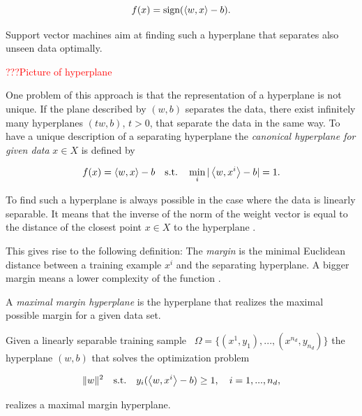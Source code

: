 \[ f(x) = \text{sign}(\left\langle w,x\right\rangle-b). \]

Support vector machines aim at finding such a hyperplane that separates also unseen data optimally.

\textcolor{red}{???Picture of hyperplane}

One problem of this approach is that the representation of a hyperplane is not unique. If the plane described by \((w,b)\) separates the data, there exist infinitely many hyperplanes \((tw,b)\), \(t>0\), that separate the data in the same way.
To have a unique description of a separating hyperplane the \emph{canonical hyperplane for given data} \(x \in X\) is defined by 

\[ f(x) = \left\langle w, x\right\rangle - b  \quad \text{s.t.} \quad \min_i \vert\left\langle w,x^i\right\rangle -b\vert = 1.\] 

To find such a hyperplane is always possible in the case where the data is  linearly separable. It means that the inverse of the norm of the weight vector is equal to the distance of the closest point \(x \in X \) to  the hyperplane \cite[p. 10]{Kunapuli2008}.



This gives rise to the following definition:
The \emph{margin} is the minimal Euclidean distance between a training example \(x^i\) and the separating hyperplane.
A bigger margin means a lower complexity of the function \cite{Cristianini2000}. 

A \emph{maximal margin hyperplane} is the hyperplane that realizes the maximal possible margin for a given data set.

\begin{proposition}
Given a linearly separable training sample \ \(\Omega = \{(x^1,y_1),...,(x^{n_d},y_{n_d})\}\) the hyperplane \((w,b)\) that solves the optimization problem

\[\|w\|^2 \quad \text{s.t.} \quad y_i(\left\langle w,x^i\right\rangle-b)\geq 1, \quad i = 1,...,n_d, \]

realizes a maximal margin hyperplane.
\end{proposition}

